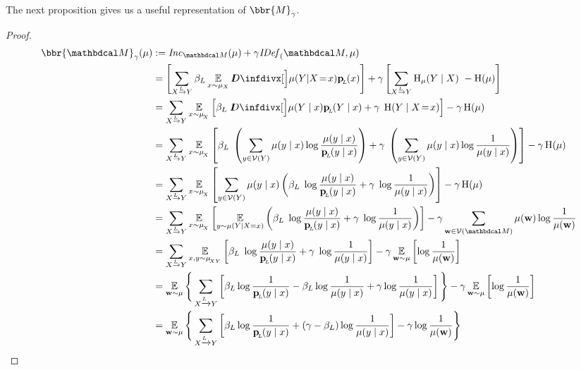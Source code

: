 The next proposition gives us a useful representation of $\bbr{M}_\gamma$.
\propnicescore*
\begin{proof}
  \begin{align*}
		\bbr{\dg M}_\gamma(\mu) &:= \Inc_{\dg M}( \mu) + \gamma \IBal(\dg M, \mu) \\
			&= \left[\sum\alle \beta_L \E_{x\sim \mu_X}\kldiv[\Big]{ \mu(Y | X \sheq x) }{\bp(x) } \right]  + \gamma \left[\sum\alle \H_\mu(Y\mid X) ~-\H(\mu)\right]\\
			&= \sum\alle 
				\E_{x \sim \mu_{\!_X}}  \left[ \beta_L\; \kldiv[\Big]{ \mu(Y \mid x) }{\bp(Y \mid x) } + \gamma \; \H(Y \mid X\sheq x) \right]  - \gamma \H(\mu) \\ 
			&= \sum\alle 
				\E_{x \sim \mu_{\!_X}}  \left[ \beta_L\; \left(\sum_{y \in \V(Y)} \mu(y \mid x) \log\frac{\mu(y\mid x)}{\bp(y\mid x)}\right) + \gamma \; \left(\sum_{y \in \V(Y)} \mu(y\mid x) \log \frac{1}{\mu(y\mid x)} \right) \right]  - \gamma  \H(\mu) \\ 
			&= \sum\alle 
				\E_{x \sim \mu_{\!_X}}  \left[ \sum_{y \in \V(Y)} \mu(y \mid x) \left(  \beta_L\; \log\frac{\mu(y\mid x)}{\bp(y\mid x)} + \gamma \; \log \frac{1}{\mu(y\mid x)} \right) \right]  - \gamma  \H(\mu) \\
			&= \sum\alle 
				\E_{x \sim \mu_{\!_X}}  \left[ \E_{y \sim \mu(Y \mid X=x)} \left(  \beta_L\; \log\frac{\mu(y\mid x)}{\bp(y\mid x)} + \gamma \; \log \frac{1}{\mu(y\mid x)} \right) \right]  - \gamma \sum_{\mat w \in \V(\dg M)} \mu(\mat w) \log \frac{1}{\mu(\mat w)} \\  
			&= \sum\alle 
				\E_{x,y \sim \mu_{\!_{XY}}}  \left[ \beta_L\; \log\frac{\mu(y\mid x)}{\bp(y\mid x)} + \gamma \; \log \frac{1}{\mu(y\mid x)}  \right]  - \gamma  \E_{\mat w \sim \mu} \left[ \log \frac{1}{\mu(\mat w)}\right] \\
			&= \E_{\mat w \sim \mu} \Bigg\{   \sum_{ X \xrightarrow{\!\!L} Y  } \left[
				\beta_L \log \frac{1}{\bp(y\mid x)}   - \beta_L  \log \frac{1}{\mu(y \mid x)}+ \gamma \log \frac{1}{\mu(y \mid x)} \right]\Bigg\}  -  \gamma  \E_{\mat w \sim \mu} \left[\log \frac{1}{\mu(\mat w)}\right] \\
			&=  \E_{\mat w \sim \mu} \Bigg\{ \sum_{ X \xrightarrow{\!\!L} Y  } \left[
				\beta_L \log \frac{1}{\bp(y\mid x)} + (\gamma - \beta_L ) \log \frac{1}{\mu(y \mid x)} \right] - \gamma \log \frac{1}{\mu(\mat w)} \Bigg\} 
	\end{align*}
\end{proof}

